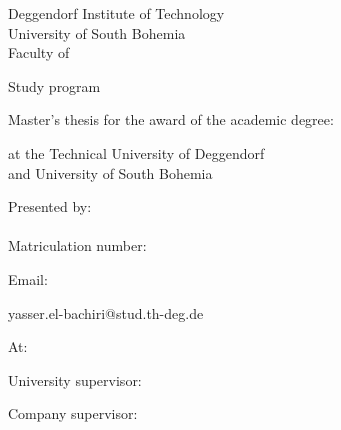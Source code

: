 \begin{titlepage}
\begin{center}
	{
	Deggendorf Institute of Technology\\
	University of South Bohemia\\
	Faculty of \faculty\par}
	\vspace{.2cm}
{\Large Study program \studies\\}
\vspace{6\baselineskip}
\end{center}
{\Huge{}\thesistitleEN\par} 
\begin{center}
\vspace{6\baselineskip}

Master's thesis for the award of the academic degree:

	\vspace{.2cm}
	\emph{\degree}
	\vspace{.2cm}

at the Technical University of Deggendorf\\
and University of South Bohemia
\end{center}
\vfill
\parbox[t]{.5\textwidth}{
	Presented by:\\
	\student\\
	Matriculation number: \par\matrnr\par
        Email: \par yasser.el-bachiri@stud.th-deg.de\par
	\vspace{\baselineskip}
        \vspace{\baselineskip}
	At: \submissiondate\par
}
\hfill
\parbox[t]{.4\textwidth}{
University supervisor:\\
\supervisor%

\ifthenelse{\equal{\secsupervisor}{}}{}
{%
\vspace{\baselineskip}
Company supervisor:\\
\secsupervisor%
}}
\end{titlepage}
\cleardoublepage\par
